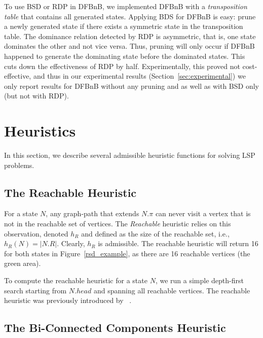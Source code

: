\documentclass[letterpaper]{article} %
\newcommand{\inlinecite}[1]{\citeauthor{#1} \shortcite{#1}}
\begin{document}
To use BSD or RDP in DFBnB, we implemented DFBnB with a \emph{transposition table} that contains all generated states. Applying BDS for DFBnB is easy: prune a newly generated state if there exists a symmetric state in the transposition table.
The dominance relation detected by RDP is asymmetric, that is, one state dominates the other and not vice versa. Thus, pruning will only occur if DFBnB happened to generate the dominating state before the dominated states. This cuts down the effectiveness of RDP by half. Experimentally, this proved not cost-effective, and thus in our experimental results (Section~\ref{sec:experimental}) we only report results for DFBnB without any pruning and as well as with BSD only (but not with RDP).





\section{Heuristics}
\label{sec:heuristics}
In this section, we describe several admissible heuristic functions for solving LSP problems. %

\subsection{The Reachable Heuristic}

For a state $N$, any graph-path that extends $N.\pi$ can never visit a vertex that is not in the reachable set of vertices. The \emph{Reachable} heuristic relies on this observation, denoted $h_{R}$
and defined as the size of the reachable set, i.e., $h_R(N)=|N.R|$. Clearly, $h_R$ is admissible.
The reachable heuristic will return 16 for both states in Figure~\ref{rsd_example}, as there are 16 reachable vertices (the green area).

To compute the reachable heuristic for a state $N$, we run a simple depth-first search starting from $N.head$ and spanning all reachable vertices.
The reachable heuristic was previously introduced by~\inlinecite{DBLP:conf/socs/SternKPFR14}.

\subsection{The Bi-Connected Components Heuristic}
\end{document}

